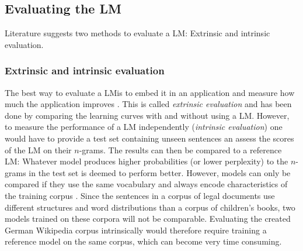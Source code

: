 

\subsection{Evaluating the \ac{LM}}

Literature suggests two methods to evaluate a \ac{LM}: Extrinsic and intrinsic evaluation.

\subsubsection{Extrinsic and intrinsic evaluation}

The best way to evaluate a \ac{LM}is to embed it in an application and measure how much the application improves \parencite{slp3}. This is called \textit{extrinsic evaluation} and has been done by comparing the learning curves with and without using a \ac{LM}. However, to measure the performance of a \ac{LM} independently (\textit{intrinsic evaluation}) one would have to provide a test set containing unseen sentences an assess the scores of the \ac{LM} on their $n$-grams. The results can then be compared to a reference \ac{LM}: Whatever model produces higher probabilities (or lower perplexity) to the $n$-grams in the test set is deemed to perform better. However, models can only be compared if they use the same vocabulary and always encode characteristics of the training corpus \parencite{slp3}. Since the sentences in a corpus of legal documents use different structures and word distributions than a corpus of children's books, two models trained on these corpora will not be comparable. Evaluating the created German Wikipedia corpus intrinsically would therefore require training a reference model on the same corpus, which can become very time consuming.

